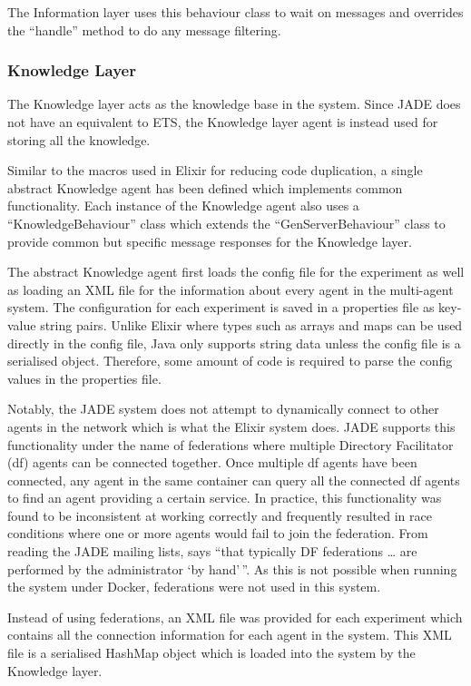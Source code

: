 The Information layer uses this behaviour class to wait on messages and overrides the ``handle'' method to do any message filtering.

\subsubsection{Knowledge Layer}

The Knowledge layer acts as the knowledge base in the system.
Since JADE does not have an equivalent to ETS, the Knowledge layer agent is instead used for storing all the knowledge.

Similar to the macros used in Elixir for reducing code duplication, a single abstract Knowledge agent has been defined which implements common functionality.
Each instance of the Knowledge agent also uses a ``KnowledgeBehaviour'' class which extends the ``GenServerBehaviour'' class to provide common but specific message responses for the Knowledge layer.

The abstract Knowledge agent first loads the config file for the experiment as well as loading an XML file for the information about every agent in the multi-agent system.
The configuration for each experiment is saved in a properties file as key-value string pairs.
Unlike Elixir where types such as arrays and maps can be used directly in the config file, Java only supports string data unless the config file is a serialised object.
Therefore, some amount of code is required to parse the config values in the properties file.

Notably, the JADE system does not attempt to dynamically connect to other agents in the network which is what the Elixir system does.
JADE supports this functionality under the name of federations where multiple Directory Facilitator (df) agents can be connected together.
Once multiple df agents have been connected, any agent in the same container can query all the connected df agents to find an agent providing a certain service.
In practice, this functionality was found to be inconsistent at working correctly and frequently resulted in race conditions where one or more agents would fail to join the federation.
From reading the JADE mailing lists,  says ``that typically DF federations \dots{} are performed by the administrator `by hand'\,''.
As this is not possible when running the system under Docker, federations were not used in this system.

Instead of using federations, an XML file was provided for each experiment which contains all the connection information for each agent in the system.
This XML file is a serialised HashMap object which is loaded into the system by the Knowledge layer.

